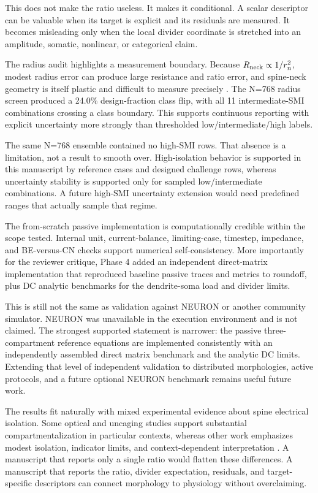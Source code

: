 This does not make the ratio useless. It makes it conditional. A scalar descriptor can be valuable when its target is explicit and its residuals are measured. It becomes misleading only when the local divider coordinate is stretched into an amplitude, somatic, nonlinear, or categorical claim.

The radius audit highlights a measurement boundary. Because $R_{\mathrm{neck}} \propto 1/r_n^2$, modest radius error can produce large resistance and ratio error, and spine-neck geometry is itself plastic and difficult to measure precisely \citep{Tonnesen2014SpineNeckPlasticity,TonnesenNagerl2016}. The N=768 radius screen produced a 24.0\% design-fraction class flip, with all 11 intermediate-SMI combinations crossing a class boundary. This supports continuous reporting with explicit uncertainty more strongly than thresholded low/intermediate/high labels.

The same N=768 ensemble contained no high-SMI rows. That absence is a limitation, not a result to smooth over. High-isolation behavior is supported in this manuscript by reference cases and designed challenge rows, whereas uncertainty stability is supported only for sampled low/intermediate combinations. A future high-SMI uncertainty extension would need predefined ranges that actually sample that regime.

The from-scratch passive implementation is computationally credible within the scope tested. Internal unit, current-balance, limiting-case, timestep, impedance, and BE-versus-CN checks support numerical self-consistency. More importantly for the reviewer critique, Phase 4 added an independent direct-matrix implementation that reproduced baseline passive traces and metrics to roundoff, plus DC analytic benchmarks for the dendrite-soma load and divider limits.

This is still not the same as validation against NEURON or another community simulator. NEURON was unavailable in the execution environment and is not claimed. The strongest supported statement is narrower: the passive three-compartment reference equations are implemented consistently with an independently assembled direct matrix benchmark and the analytic DC limits. Extending that level of independent validation to distributed morphologies, active protocols, and a future optional NEURON benchmark remains useful future work.

The results fit naturally with mixed experimental evidence about spine electrical isolation. Some optical and uncaging studies support substantial compartmentalization in particular contexts, whereas other work emphasizes modest isolation, indicator limits, and context-dependent interpretation \citep{Araya2006,Kwon2017,Cornejo2022,Popovic2015,Zecevic2023}. A manuscript that reports only a single ratio would flatten these differences. A manuscript that reports the ratio, divider expectation, residuals, and target-specific descriptors can connect morphology to physiology without overclaiming.

